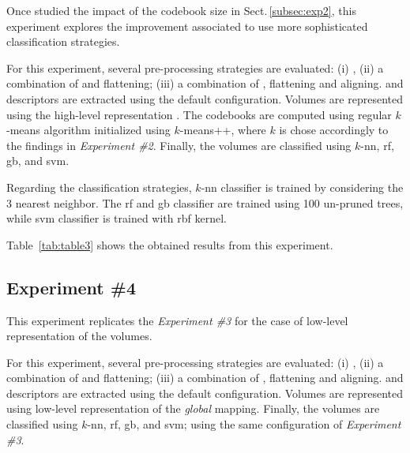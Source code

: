 Once studied the impact of the codebook size in Sect.\,\ref{subsec:exp2}, this experiment explores the improvement associated to use more sophisticated classification strategies.

For this experiment, several pre-processing strategies are evaluated: (i) \nlm, (ii) a combination of \nlm and flattening; (iii) a combination of \nlm, flattening and aligning.
\lbp and \lbptop descriptors are extracted using the default configuration.
Volumes are represented using the high-level representation \bow. The codebooks are computed using regular $k$-means algorithm initialized using $k$-means++, where $k$ is chose accordingly to the findings in \emph{Experiment \#2}.
Finally, the volumes are classified using $k$-\ac{nn}, \ac{rf}, \ac{gb}, and \ac{svm}.

Regarding the classification strategies, $k$-\ac{nn} classifier is trained by considering the 3 nearest neighbor.
The \ac{rf} and \ac{gb} classifier are trained using 100 un-pruned trees, while \ac{svm} classifier is trained with \ac{rbf} kernel.

Table~\ref{tab:table3} shows the obtained results from this experiment.





\subsection{Experiment \#4}\label{subsec:exp4}
%
%
%
%

This experiment replicates the \emph{Experiment \#3} for the case of low-level representation of the volumes.

For this experiment, several pre-processing strategies are evaluated: (i) \nlm, (ii) a combination of \nlm and flattening; (iii) a combination of \nlm, flattening and aligning.
\lbp and \lbptop descriptors are extracted using the default configuration.
Volumes are represented using low-level representation of the \emph{global} mapping.
Finally, the volumes are classified using $k$-\ac{nn}, \ac{rf}, \ac{gb}, and \ac{svm}; using the same configuration of \emph{Experiment \#3}.

